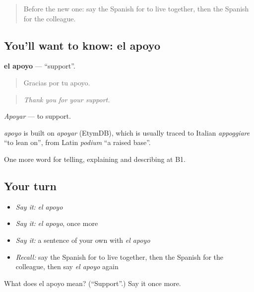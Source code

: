 \label{lesson:ES-C750-apoyo}



\begin{quote}
Before the new one: say the Spanish for to live together, then the Spanish for the colleague.
\end{quote}

\subsection*{You'll want to know: el apoyo}
\textbf{el apoyo} — \textquotedblleft{}support\textquotedblright{}.

\begin{quote}
Gracias por tu apoyo.
\end{quote}

\begin{quote}
\emph{Thank you for your support.}
\end{quote}

\emph{Apoyar} — to support.

\begin{cousinweb}
\emph{apoyo} is built on \emph{apoyar} (EtymDB), which is usually traced to Italian \emph{appoggiare} \textquotedblleft{}to lean on\textquotedblright{}, from Latin \emph{podium} \textquotedblleft{}a raised base\textquotedblright{}.
\end{cousinweb}

\begin{grammarlens}[title={What you've built}]
One more word for telling, explaining and describing at B1.
\end{grammarlens}

\subsection*{Your turn}
\begin{itemize}
\raggedright
  \item \emph{Say it:} \emph{el apoyo}
  \item \emph{Say it:} \emph{el apoyo}, once more
  \item \emph{Say it:} a sentence of your own with \emph{el apoyo}
  \item \emph{Recall:} say the Spanish for to live together, then the Spanish for the colleague, then say \emph{el apoyo} again
\end{itemize}

\begin{tcolorbox}[breakable,colback=teal!4,colframe=teal!35!black,title={Before you move on}]
What does el apoyo mean? (\textquotedblleft{}Support\textquotedblright{}.) Say it once more.
\end{tcolorbox}
